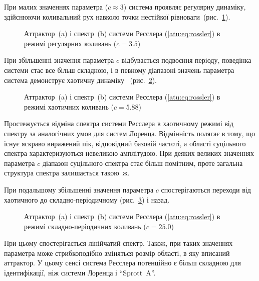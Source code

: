 При малих значеннях параметра (\(c \approx 3 \)) система проявляє
регулярну динаміку, здійснюючи коливальний рух навколо точки
нестійкої рівноваги~(рис.~\ref{atu:f:ross_attractor_0300}).

\begin{figure}[htb!]
  \caption{Аттрактор~(a) і спектр~(b) системи Ресслера (\ref{atu:eq:rossler}) в режимі регулярних коливань ($c = 3.5$)}
\label{atu:f:ross_attractor_0300}
\end{figure}

При збільшенні значення параметра \(c\) відбувається подвоєння
періоду, поведінка системи стає все більш складною, і в певному
діапазоні значень параметра система демонструє хаотичну
динаміку~\cite{atu_st67} (рис.~\ref{atu:f:ross_attractor_0588}).

\begin{figure}[htb!]
  \caption{Аттрактор~(a) і спектр~(b) системи Ресслера (\ref{atu:eq:rossler}) в режимі хаотичних коливань ($ c = 5.88 $)}
\label{atu:f:ross_attractor_0588}
\end{figure}


Простежується відміна спектра системи Ресслера в хаотичному
режимі від спектру за аналогічних умов для систем Лоренца. Відмінність
полягає в тому, що існує яскраво виражений пік, відповідний
базовій частоті, а області суцільного спектра характеризуються
невеликою амплітудою. При деяких великих значеннях параметра
$c$ діапазон суцільного спектра стає більш помітним, проте
загальна структура спектра залишається такою~ж.

При подальшому збільшенні значення параметра
\(c\) спостерігаються переходи від хаотичного до
складно-періодичному (рис.~\ref{atu:f:ross_attractor_2500}) і назад.

\begin{figure}[htb!]
  \caption{Аттрактор~(a) і спектр~(b) системи Ресслера (\ref{atu:eq:rossler}) в режимі складно-періодичних коливань ($ c = 25.0 $)}
\label{atu:f:ross_attractor_2500}
\end{figure}

При цьому спостерігається лінійчатий спектр. Також, при таких
значеннях параметра може стрибкоподібно зміняться розмір області, в яку
вписаний аттрактор. У цьому сенсі система Ресслера потенційно є
більш складною для ідентифікації, ніж системи Лоренца і ``Sprott~A''.

